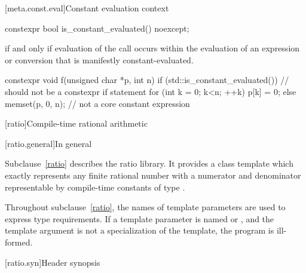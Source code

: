[meta.const.eval]{Constant evaluation context}
\begin{itemdecl}
constexpr bool is_constant_evaluated() noexcept;
\end{itemdecl}

\begin{itemdescr}
\pnum
\returns
{} if and only if evaluation of the call occurs
within the evaluation of an expression or conversion
that is manifestly constant-evaluated.

\pnum
\begin{example}
\begin{codeblock}
constexpr void f(unsigned char *p, int n) {
  if (std::is_constant_evaluated()) {           // should not be a constexpr if statement
    for (int k = 0; k<n; ++k) p[k] = 0;
  } else {
    memset(p, 0, n);                            // not a core constant expression
  }
}
\end{codeblock}
\end{example}
\end{itemdescr}

[ratio]{Compile-time rational arithmetic}

[ratio.general]{In general}

\pnum
{}%
Subclause~\ref{ratio} describes the ratio library. It provides a class template
 which exactly represents any finite rational number with a
numerator and denominator representable by compile-time constants of type
.

\pnum
Throughout subclause~\ref{ratio}, the names of template parameters are used to express
type requirements. If a template parameter is named  or ,
and the template argument is not a specialization of the  template,
the program is ill-formed.

[ratio.syn]{Header  synopsis}

